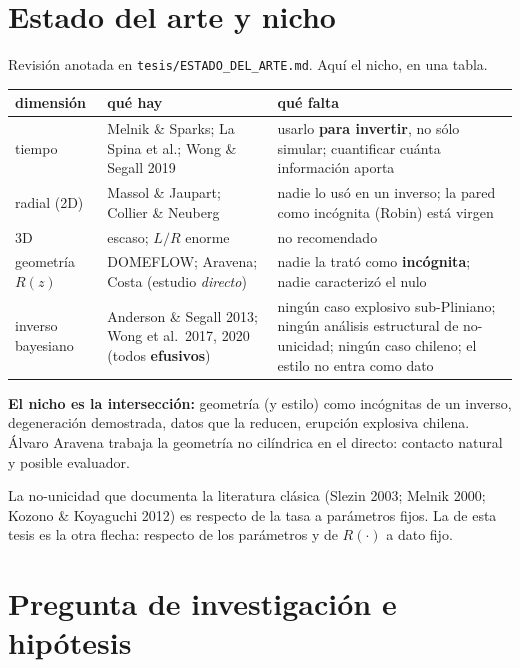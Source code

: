 \documentclass[11pt,a4paper]{article}
\theoremstyle{plain}
\theoremstyle{definition}
\theoremstyle{remark}
\begin{document}
\section{Estado del arte y nicho}
\label{sec:arte}

Revisión anotada en \texttt{tesis/ESTADO\_DEL\_ARTE.md}. Aquí el
nicho, en una tabla.

\begin{center}
\small
\begin{tabular}{@{}p{}p{}p{}@{}}
\toprule
dimensión & qué hay & qué falta \\
\midrule
tiempo &
  Melnik \& Sparks; La Spina et al.; Wong \& Segall 2019 &
  usarlo \textbf{para invertir}, no sólo simular; cuantificar
  cuánta información aporta \\
radial (2D) &
  Massol \& Jaupart; Collier \& Neuberg &
  nadie lo usó en un inverso; la pared como incógnita (Robin)
  está virgen \\
3D &
  escaso; $L/R$ enorme &
  no recomendado \\
geometría $R(z)$ &
  DOMEFLOW; Aravena; Costa (estudio \emph{directo}) &
  nadie la trató como \textbf{incógnita}; nadie caracterizó el
  nulo \\
inverso bayesiano &
  Anderson \& Segall 2013; Wong et al.\ 2017, 2020
  (todos \textbf{efusivos}) &
  ningún caso explosivo sub-Pliniano; ningún análisis
  estructural de no-unicidad; ningún caso chileno;
  el estilo no entra como dato \\
\bottomrule
\end{tabular}
\end{center}

\vspace{0.4em}
\textbf{El nicho es la intersección:} geometría (y estilo) como
incógnitas de un inverso, degeneración demostrada, datos que la
reducen, erupción explosiva chilena. Álvaro Aravena trabaja la
geometría no cilíndrica en el directo: contacto natural y posible
evaluador.

La no-unicidad que documenta la literatura clásica (Slezin 2003;
Melnik 2000; Kozono \& Koyaguchi 2012) es respecto de la tasa a
parámetros fijos. La de esta tesis es la otra flecha: respecto de
los parámetros y de $R(\cdot)$ a dato fijo.

\section{Pregunta de investigación e hipótesis}
\label{sec:pregunta}
\end{document}
